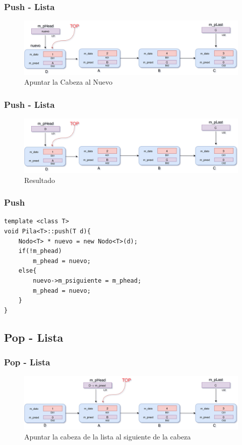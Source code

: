 \documentclass{beamer}
\begin{document}
\begin{frame}
    \frametitle{Push - Lista}
    
    \begin{figure}
    \includegraphics[width =1 \textwidth]{images/push03}
    \caption{Apuntar la Cabeza al Nuevo}
    \end{figure}
       
\end{frame}


\begin{frame}
    \frametitle{Push - Lista}
    
    \begin{figure}
    \includegraphics[width =1 \textwidth]{images/push04}
    \caption{Resultado}
    \end{figure}
       
\end{frame}


\begin{frame}[fragile]
\frametitle{Push}
\begin{verbatim}
template <class T>
void Pila<T>::push(T d){
	Nodo<T> * nuevo = new Nodo<T>(d);
	if(!m_phead)
		m_phead = nuevo;
	else{
		nuevo->m_psiguiente = m_phead;
		m_phead = nuevo;
	}
}
\end{verbatim}
\end{frame}  


\subsection{Pop - Lista}
\begin{frame}
    \frametitle{Pop - Lista}
    
    \begin{figure}
    \includegraphics[width =1 \textwidth]{images/pop02}
    \caption{Apuntar la cabeza de la lista al siguiente de la cabeza}
    \end{figure}
       
\end{frame}
\end{document}
